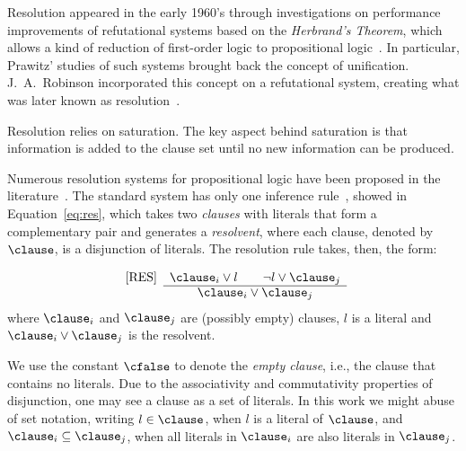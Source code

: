 Resolution appeared in the early 1960's through investigations on performance
improvements of refutational systems based on the \emph{Herbrand's Theorem}, which
allows a kind of reduction of first-order logic to propositional
logic~\cite{casanova}. In particular, Prawitz' studies of such systems brought
back the concept of unification. J.~A.~Robinson incorporated this concept on a
refutational system, creating what was later known as
resolution~\cite{Robinson65}. 

Resolution relies on saturation.
The key aspect behind saturation is that information is added to the clause set until no new information can be produced. %

Numerous resolution systems for propositional logic have been proposed in the
literature~\cite{bachmair2001resolution}. The standard system has only one
inference rule~\cite{Robinson65}, showed in Equation~\ref{eq:res}, which takes
two \emph{clauses} with literals that form a complementary pair and generates a
\emph{resolvent}, where each clause, denoted by $\clause$, is a disjunction of
literals. The resolution rule takes, then, the form:

\begin{equation}
\label{eq:res}
 \begin{array}{lc}
     \mbox{[RES]} & \clause_i \lor l \qquad \neg l \lor \clause_j\\  \cline{2-2}
     & \clause_i \lor \clause_j
\end{array}
\end{equation}
where $\clause_i$ and $\clause_j$ are (possibly empty) clauses, $l$ is a literal
and $\clause_i \lor \clause_j$ is the resolvent.

We use the constant $\cfalse$ to denote the \emph{empty clause},
i.e., the clause that contains no literals. Due to the associativity and
commutativity properties of disjunction, one may see a clause as a set of
literals. In this work we might abuse of set notation, writing $l \in \clause$,
when $l$ is a literal of $\clause$, and $\clause_i \subseteq \clause_j$, when
all literals in $\clause_i$ are also literals in $\clause_j$.


